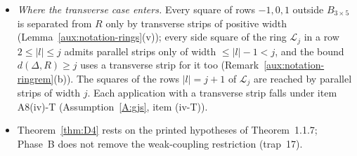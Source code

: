 \documentclass[11pt,a4paper]{article}
\theoremstyle{plain}
\theoremstyle{definition}
\theoremstyle{plain}
\theoremstyle{definition}
\newcommand{\GJS}[1]{\lVert #1\rVert_{\mathrm{GJS}}}   %
\begin{document}
\begin{itemize}
\begin{itemize}
(through Lemma~\ref{lem:D2}, which uses Lemma~\ref{lem:uv}),
$\overline\Sigma_{3\times5}$ bounding the sum of $e^{-m_1w_\Delta}$ over the charged squares
outside $B_{3\times5}$;
\item the last factor bounds $\GJS{Q_V}$ as in \eqref{eq:QVnorm}, whose
``$=M^2/C_8$'' no longer applies (plan, item n14).
\end{itemize}
\item \emph{Where the transverse case enters.} Every square of rows $-1,0,1$ outside
$B_{3\times5}$ is separated from $R$ only by transverse strips of positive width
(Lemma~\ref{aux:notation-rings}(v)); every side square of the ring $\mathcal L_j$ in a row
$2\le|l|\le j$ admits parallel strips only of width $\le|l|-1<j$, and the bound
$d(\Delta,R)\ge j$ uses a transverse strip for it too
(Remark~\ref{aux:notation-ringrem}(b)). The squares of the rows $|l|=j+1$ of $\mathcal L_j$
are reached by parallel strips of width $j$. Each application with a transverse strip falls
under item A8(iv)-T (Assumption~\ref{A:gjs}, item (iv-T)).
\item Theorem~\ref{thm:D4} rests on the printed hypotheses of Theorem~1.1.7; Phase~B does not
remove the weak-coupling restriction (trap~17).
\end{itemize}
\end{document}

